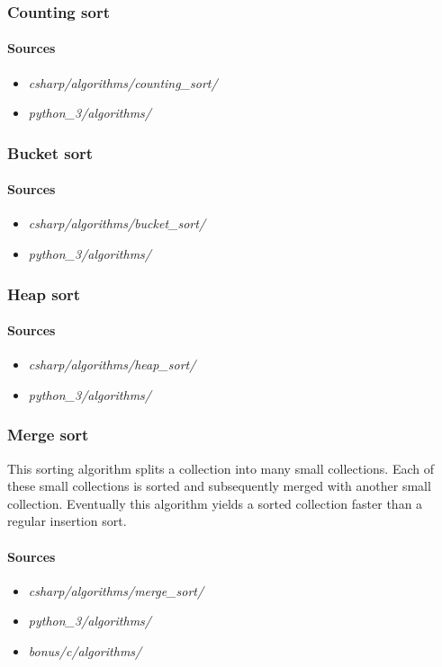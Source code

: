 \documentclass{article}
\begin{document}
\subsubsection{Counting sort}
\paragraph{Sources}
\begin{itemize}
\item{{\em csharp/algorithms/counting\_sort/}}
\item{{\em python\_3/algorithms/}}
\end{itemize}


\subsubsection{Bucket sort}
\paragraph{Sources}
\begin{itemize}
\item{{\em csharp/algorithms/bucket\_sort/}}
\item{{\em python\_3/algorithms/}}
\end{itemize}


\subsubsection{Heap sort}
\paragraph{Sources}
\begin{itemize}
\item{{\em csharp/algorithms/heap\_sort/}}
\item{{\em python\_3/algorithms/}}
\end{itemize}


\subsubsection{Merge sort}
This sorting algorithm splits a collection into many small collections.
Each of these small collections is sorted and subsequently merged with another small collection.
Eventually this algorithm yields a sorted collection faster than a regular insertion sort.

\paragraph{Sources}
\begin{itemize}
\item{{\em csharp/algorithms/merge\_sort/}}
\item{{\em python\_3/algorithms/}}
\item{{\em bonus/c/algorithms/}}
\end{itemize}
\end{document}
